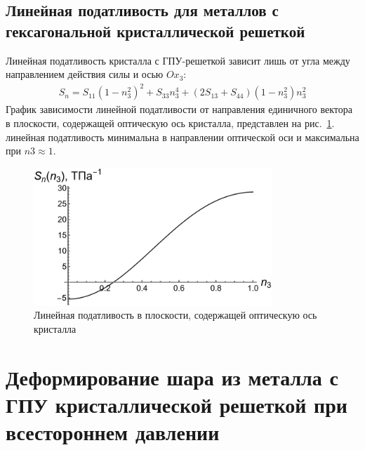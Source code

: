 \documentclass[12pt, a4paper]{article}
\begin{document}
\subsection{Линейная податливость для металлов с гексагональной кристаллической решеткой}
Линейная податливость кристалла с ГПУ-решеткой зависит лишь от угла между
направлением действия силы и осью $Ox_3:$
\begin{gather}
	\label{lin-geks-form}
S_n = S_{11} \left(1 - n_3^2\right)^2 + S_{33} n_3^4
 + (2 S_{13} + S_{44}) (1 - n^2_3)n^2_3
\end{gather}
График зависимости линейной податливости от направления единичного вектора
в плоскости, содержащей оптическую ось кристалла, представлен на рис.~\ref{lin-pod-v-plock-krsit-pic-4}. линейная податливость минимальна в направлении оптической оси и максимальна при
$n3 \approx 1$.
\begin{figure}[!htbp]
	\centering
	\includegraphics[width=0.8\textwidth]{pic-4}%
	\caption{Линейная податливость в плоскости, содержащей оптическую ось кристалла}
	\vspace*{-2mm}
	\label{lin-pod-v-plock-krsit-pic-4}
\end{figure}

\section{Деформирование шара из металла с ГПУ кристаллической решеткой при всестороннем давлении}
\end{document}
